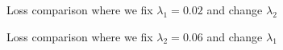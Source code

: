 \documentclass[a4paper,11pt,oneside]{report}
\theoremstyle{named}
\begin{document}
\begin{figure}
    \centering
    \caption{Loss comparison where we fix $\lambda_1 = 0.02$ and change $\lambda_2$}
    \label{fig:lossl2}
\end{figure}

\begin{figure}
    \centering
    \caption{Loss comparison where we fix $\lambda_2 = 0.06$ and change $\lambda_1$}
    \label{fig:lossl1}
\end{figure}
\end{document}
